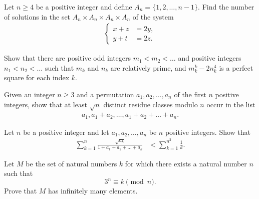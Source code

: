 \documentclass[problems.tex]{subfile}
\begin{document}
	
	\begin{problem}
		Let $n \geq 4$ be a positive integer and define $A_n = \{1, 2, \dots, n -1\}$. Find the number of solutions in the set $A_n \times  A_n \times A_n \times A_n$ of the system
		\begin{align*}
			\begin{cases}
				x+z &= 2y,\\
				y+t &= 2z.
			\end{cases}
		\end{align*}
	\end{problem}
	
	
	
	\begin{problem}
		Show that there are positive odd integers $m_1 < m_2 < \dots  $ and positive integers $n_1 < n_2 < \dots$ such that $m_k$ and $n_k$ are relatively prime, and $m_k^k - 2n_k^4$ is a perfect square for each index $k$.
	\end{problem}
	
	
	\begin{problem}
		Given an integer $n \geq 3$ and a permutation $a_1, a_2, \dots, a_n$ of the first $n$ positive integers, show that at least $\sqrt n$ distinct residue classes modulo $n$ occur in the list 
		\begin{align*}
			a_1, a_1 + a_2, \dots, a_1 + a_2 + \dots + a_n.
		\end{align*}
	\end{problem}
	
	
	\begin{problem}
		Let $n$ be a positive integer and let $a_1, a_2, \dots, a_n$ be $n$ positive integers. Show that
		\begin{align*}
			\sum_{k=1}^{n} \frac{\sqrt{a_k}}{1+a_1+a_2+\dots +a_k} &< \sum_{k=1}^{n^2} \frac{1}{k}.
		\end{align*}
	\end{problem}
	
	
	
	
	
	\begin{problem}
		Let $M$ be the set of natural numbers $k$ for which there exists a natural number $n$ such that
		$$3^n \equiv k\pmod n.$$ Prove that $M$ has infinitely many elements. %
	\end{problem}
	
\end{document}
